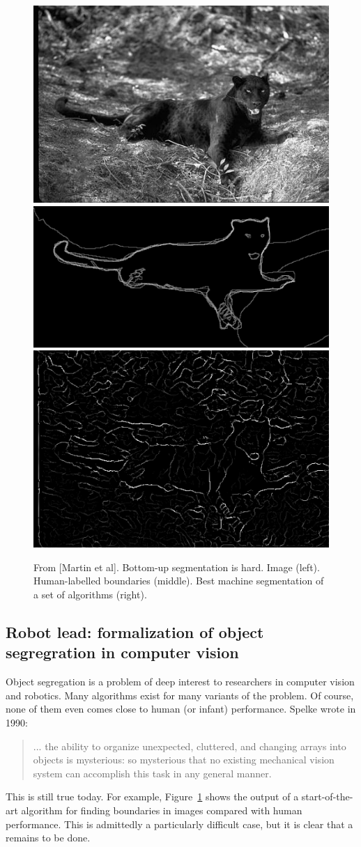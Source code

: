 \begin{figure}[t]

\centerline{
\includegraphics[width=0.3\columnwidth]{cat}
\includegraphics[width=0.3\columnwidth]{cat-human}
\includegraphics[width=0.3\columnwidth]{cat-machine}
}

\caption{
From [Martin et al].  Bottom-up segmentation is hard.
Image (left).  Human-labelled boundaries (middle).
Best machine segmentation of a set of algorithms (right).
}

\label{fig:segmentation-is-hard}

\end{figure}


\subsection{Robot lead: formalization of object segregration in computer vision}

Object segregation is a problem of deep interest to researchers in
computer vision and robotics.  Many algorithms exist for many variants
of the problem.  
Of course, none of them even comes close to human (or
infant) performance.  
Spelke wrote in 1990:

\begin{quote}

... the ability to organize unexpected, cluttered, and
changing arrays into objects is mysterious: so mysterious
that no existing mechanical vision system can accomplish this task
in any general manner.
\cite{spelke90principles}

\end{quote}

\noindent
This is still true today.
For example, Figure~\ref{fig:segmentation-is-hard} shows the
output of a start-of-the-art algorithm for finding boundaries in images
\cite{martin04learning} compared with human performance.  This is
admittedly a particularly difficult case, but it is clear that 
a remains to
be done.


